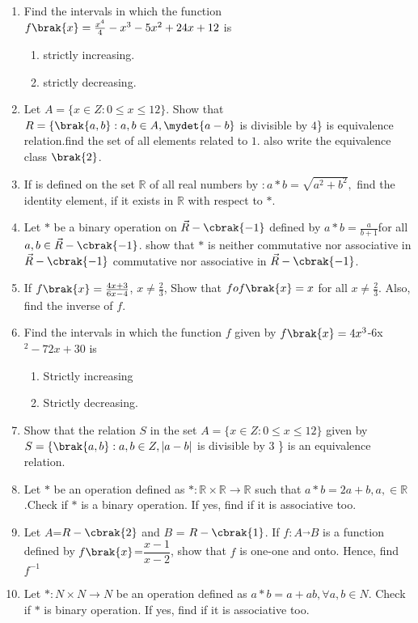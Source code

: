 \begin{enumerate}
\item Find the intervals in which the function $f\brak{x}=\frac{x^4}{4}-x^{3}-5x^{2}+24x+12 $ is 
\begin{enumerate}
  \item strictly increasing.
 \item strictly decreasing.
\end{enumerate}
 \item Let $A=\{x \in Z : 0 \leq x \leq 12\}$. Show that $R=\{\brak{a,b}: a,b \in A,\mydet{a-b}$ is divisible by $4$\} is equivalence relation.find the set of all elements related to $1$. also write the equivalence class $\brak{2}$.
\item If is defined on the set $\mathbb{R}$ of all real numbers by $ : a * b = \sqrt{a^{2}+b^{2}} ,$ find  the identity element, if it exists in $\mathbb{R}$ with respect to $*$.

\item Let $*$ be a binary operation on $\vec{R} - \cbrak{-1}$ defined by   
$a * b = \frac{a}{b + 1}$for all $a, b \in \vec{R} - \cbrak{-1}$.
show that $*$ is neither commutative nor associative in $\vec{R} - \cbrak{-1}$
commutative nor associative in $\vec{R}-\cbrak{-1}$.
\item If $f\brak{x} = \frac{4x + 3}{6x - 4}$, $x \neq \frac{2}{3}$, Show that $fof\brak{x} = x$ for all $x \neq \frac{2}{3}$. Also, find the inverse of $f$.
\item Find the intervals in which the function $f$ given by $f\brak{x} = 4x^{3}$-6x$^{2}-72x+30$ is
\begin{enumerate}
\item Strictly increasing
\item Strictly decreasing.
\end{enumerate}

\item Show that the relation $S$ in the set $A = \{x \in Z : 0  \le x  \le 12\}$ given by $S= \{\brak{a, b} : a, b \in Z, \vert{a-b}\vert $ is divisible by $ 3 $ \} is an equivalence relation.
\item Let $\ast$ be an operation defined as $\ast : \mathbb{R} \times \mathbb{R} \rightarrow \mathbb{R}$ such that $a\ast b = 2a + b,a, \in \mathbb{R}$.Check if $\ast$ is a binary operation. If yes, find if it is associative too.
\item Let $A$=$R-\cbrak{2}$ and $B$ = $R-\cbrak{1}$. If $f:A \overrightarrow{} B$ is a function defined by $f\brak{x}$=$\dfrac{x-1}{x-2}$, show that $f$ is one-one and onto. Hence, find $f^{-1}$
\item Let $\ast : N \times N \rightarrow N$ be an operation defined as $a \ast b= a+ ab,\forall a,b \in N$. Check if $\ast$ is binary operation. If yes, find if it is associative too.


\end{enumerate}
